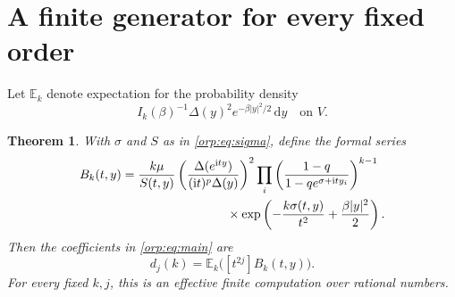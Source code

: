 \documentclass[11pt]{article}
\newtheorem{theorem}{Theorem}[section]
\theoremstyle{remark}\newtheorem{remark}[theorem]{Remark}
\newcommand{\E}{\mathbb E}
\newcommand{\ii}{\mathrm i}
\newcommand{\dd}{\,\mathrm d}
\begin{document}
\section{A finite generator for every fixed order}\label{orp:sec:generator}
Let $\E_k$ denote expectation for the probability density
\[
 I_k(\beta)^{-1}\Delta(y)^2e^{-\beta|y|^2/2}\dd y\quad\text{on }V.
\]
\begin{theorem}\label{orp:thm:generator}
With $\sigma$ and $S$ as in \eqref{orp:eq:sigma}, define the formal series
\begin{align}
 B_k(t,y)={}&\frac{k\mu}{S(t,y)}
 \left(\frac{\Delta(e^{\ii t y})}{(\ii t)^p\Delta(y)}\right)^2
 \prod_i\left(\frac{1-q}{1-qe^{\sigma+\ii t y_i}}\right)^{k-1}\nonumber\\
 &\hspace{25mm}\times\exp\left(-\frac{k\sigma(t,y)}{t^2}
                   +\frac{\beta|y|^2}{2}\right).\label{orp:eq:B}
\end{align}
Then the coefficients in \eqref{orp:eq:main} are
\begin{equation}\label{orp:eq:generator}
 d_j(k)=\E_k\bigl([t^{2j}]B_k(t,y)\bigr).
\end{equation}
For every fixed $k,j$, this is an effective finite computation over rational numbers.
\end{theorem}
\end{document}
